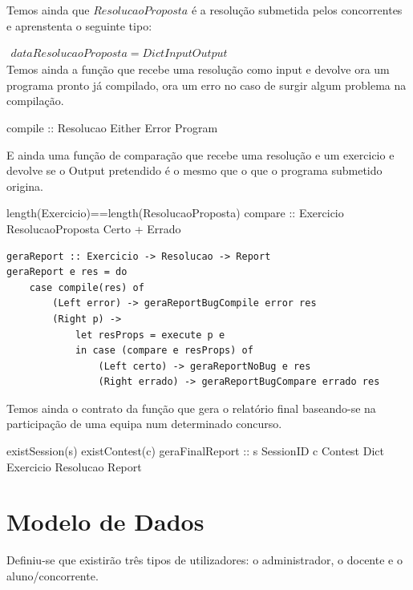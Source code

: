 Temos ainda que $ResolucaoProposta$ é a resolução submetida pelos concorrentes e aprenstenta o seguinte tipo:

$\begin{array}{l}
data ResolucaoProposta = Dict Input Output
\end{array}$\\

Temos ainda a função que recebe uma resolução como input e devolve ora um programa pronto já compilado, ora um erro no caso de surgir algum problema na compilação.

\prop
{ }
{compile :: Resolucao \rarrow Either Error Program}
{ }

E ainda uma função de comparação que recebe uma resolução e um exercicio e devolve se o Output pretendido é o mesmo que o que o programa submetido origina.

\prop
{ length(Exercicio)==length(ResolucaoProposta)}
{compare :: Exercicio \rarrow ResolucaoProposta \rarrow Certo + Errado}
{ }

\begin{lstlisting}[language=HaskellUlisses]
geraReport :: Exercicio -> Resolucao -> Report
geraReport e res = do
	case compile(res) of
		(Left error) -> geraReportBugCompile error res
		(Right p) ->
			let resProps = execute p e
			in case (compare e resProps) of
				(Left certo) -> geraReportNoBug e res
				(Right errado) -> geraReportBugCompare errado res
\end{lstlisting}


Temos ainda o contrato da função que gera o relatório final baseando-se na participação de uma equipa num determinado concurso.

\prop
{ existSession(s) \wedge existContest(c) \wedge }
{geraFinalReport :: s \unif SessionID \rarrow c \unif Contest \rarrow Dict Exercicio Resolucao \rarrow Report}
{ }

\section{Modelo de Dados}\label{sec modedados}

Definiu-se que existirão três tipos de utilizadores: o administrador, o docente e o aluno/concorrente.\\

